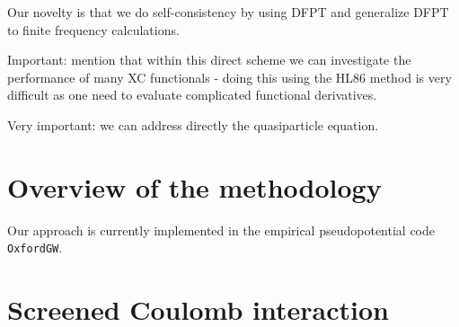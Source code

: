 \documentclass[twocolumn,prb,showpacs,superscriptaddress]{revtex4}
\begin{document}
Our novelty is that we do self-consistency by using DFPT
and generalize DFPT to finite frequency calculations.

Important: mention that within this direct scheme we can investigate
the performance of many XC functionals - doing this using the HL86
method is very difficult as one need to evaluate complicated functional
derivatives. 

Very important: we can address directly the quasiparticle equation.


\section{Overview of the methodology}

Our approach is currently implemented in the empirical
pseudopotential code {\tt OxfordGW}.\cite{oxfordgw}

\section{Screened Coulomb interaction}\label{sec.coulomb}
\end{document}
